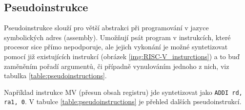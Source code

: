 \documentclass[FM,BP]{tulthesis}
\begin{document}
\subsection{Pseudoinstrukce}
Pseudoinstrukce slouží pro větší abstrakci při programování v jazyce symbolických adres (assembly). Umožňují psát program v instrukcích, které procesor sice přímo nepodporuje, ale jejich vykonání je možné syntetizovat pomocí již existujících instrukcí (obrázek \ref{img:RISC-V_insturctions}) a to buď zaměněním pořadí argumentů, či případně vynulováním jednoho z nich, viz tabulka \ref{table:pseudoinstructions}. 

Například instrukce MV (přesun obsah registru) jde syntetizovat jako \verb|ADDI rd, ra1, 0|. V tabulce \ref{table:pseudoinstructions} je přehled dalších pseudoinstrukcí. 

\newpage
\end{document}
